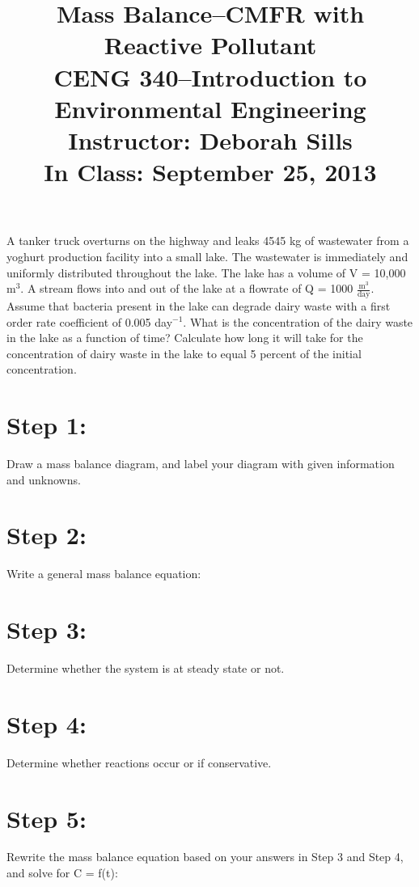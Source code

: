 \documentclass[11pt,letterpaper]{article}
\begin{document}
\setlength{\parindent}{0cm} 



\frenchspacing

\setlength{\textwidth}{6.25in}

\title {\Large{\textbf{Mass Balance--CMFR with Reactive Pollutant}}\\ \large{CENG 340--Introduction to Environmental Engineering\\
Instructor: Deborah Sills\\ \textbf{In Class: September 25, 2013}}}

\author {}
\date {}
\maketitle

\vspace{-1.5cm}

A tanker truck overturns on the highway and leaks 4545 kg of wastewater from a yoghurt production facility into a small lake.  The wastewater is immediately and uniformly distributed throughout the lake.  The lake has a volume of V = 10,000 m$^3$.  A stream flows into and out of the lake at a flowrate of Q = 1000 $\mathrm{\frac{m^3}{day}}$.  Assume that bacteria present in the lake can degrade dairy waste with a first order rate coefficient of 0.005 day$^{-1}$. What is the concentration of the dairy waste in the lake as a function of time? Calculate how long it will take for the concentration of dairy waste in the lake to equal 5 percent of the initial concentration.


\section *{Step 1:} 
Draw a mass balance diagram, and label your diagram with given information and unknowns.

\vspace{0.2in}

\section *{Step 2:}
Write a general mass balance equation:
\vspace{0.2in}

\section *{Step 3:} 
Determine whether the system is at steady state or not.
\vspace{0.2in}

\section *{Step 4:}
Determine whether reactions occur or if conservative.
\vspace{0.2in}
\section *{Step 5:}
Rewrite the mass balance equation based on your answers in Step 3 and Step 4, and solve for C = f(t):
\end{document}
